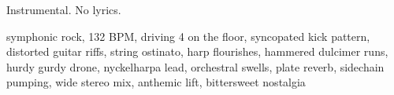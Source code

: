
\begin{notes}
Instrumental. No lyrics.
\end{notes}
\begin{prompt}
symphonic rock, 132 BPM, driving 4 on the floor, syncopated kick pattern, distorted guitar riffs, string ostinato, harp flourishes, hammered dulcimer runs, hurdy gurdy drone, nyckelharpa lead, orchestral swells, plate reverb, sidechain pumping, wide stereo mix, anthemic lift, bittersweet nostalgia
\end{prompt}

